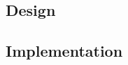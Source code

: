 \documentclass[../main.tex]{subfiles}
\begin{document}
\subsection{Design}
\subsection{Implementation}
\end{document}
